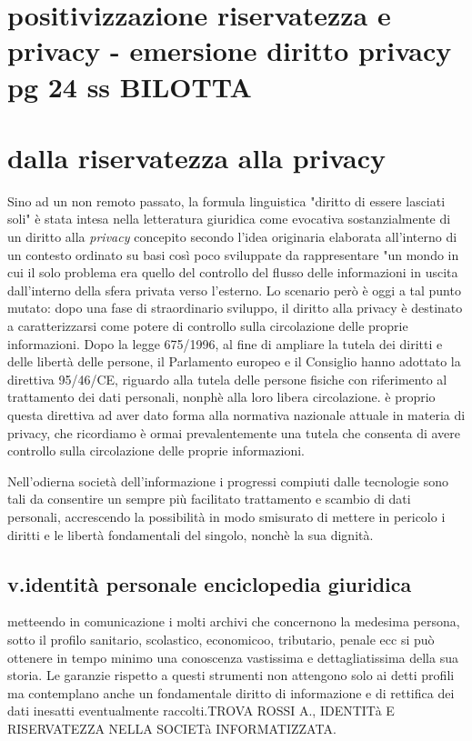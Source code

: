 \section{positivizzazione riservatezza e privacy - emersione diritto privacy pg 24 ss BILOTTA}

\section{dalla riservatezza alla privacy}
Sino ad un non remoto passato, la formula linguistica "diritto di essere lasciati soli" è stata intesa nella letteratura giuridica come evocativa sostanzialmente di un diritto alla \textit{privacy} concepito secondo l'idea originaria elaborata all'interno di un contesto ordinato su basi così poco sviluppate da rappresentare "un mondo in cui il solo problema era quello del controllo del flusso delle informazioni in uscita dall'interno della sfera privata verso l'esterno.
Lo scenario però è oggi a tal punto mutato: dopo una fase di straordinario sviluppo, il diritto alla privacy è destinato a caratterizzarsi come potere di controllo sulla circolazione delle proprie informazioni.
Dopo la legge 675/1996, al fine di ampliare la tutela dei diritti e delle libertà delle persone, il Parlamento europeo e il Consiglio hanno adottato la direttiva 95/46/CE, riguardo alla tutela delle persone fisiche con riferimento al trattamento dei dati personali, nonphè alla loro libera circolazione.
è proprio questa direttiva ad aver dato forma alla normativa nazionale attuale in materia di privacy, che ricordiamo è ormai prevalentemente  una tutela che consenta di avere controllo sulla circolazione delle proprie informazioni.

Nell'odierna società dell'informazione i progressi compiuti dalle tecnologie sono tali da consentire un sempre più facilitato trattamento e scambio di dati personali, accrescendo la possibilità in modo smisurato di mettere in pericolo i diritti e le libertà fondamentali del singolo, nonchè la sua dignità.


\subsection{v.identità personale enciclopedia giuridica}
metteendo in comunicazione i molti archivi che concernono la medesima persona, sotto il profilo sanitario, scolastico, economicoo, tributario, penale ecc si può ottenere in tempo minimo una conoscenza vastissima e dettagliatissima della sua storia. Le garanzie rispetto a questi strumenti non attengono solo ai detti profili ma contemplano anche un fondamentale diritto di informazione e di rettifica dei dati inesatti eventualmente raccolti.TROVA ROSSI A., IDENTITà E RISERVATEZZA NELLA SOCIETà INFORMATIZZATA.


